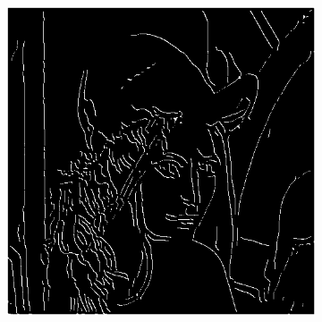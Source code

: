 \documentclass[a4paper]{article}
\begin{document}
\begin{figure}[h]
\begin{subfigure}{0.33\textwidth}
\end{subfigure}
\begin{subfigure}{0.33\textwidth}
\includegraphics[width=\textwidth]{img/sigma3/lenahys.png}
\end{subfigure}


\end{figure}
\end{document}
